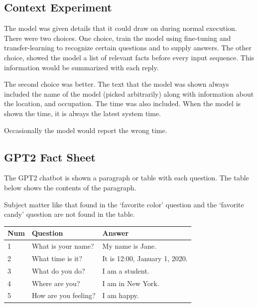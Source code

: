 \subsection{Context Experiment}
The model was given details that it could draw on during normal execution. 
There were two choices. One choice, train the model using fine-tuning and transfer-learning to recognize certain questions and to supply answers. The other choice, showed the model a list of relevant facts before every input sequence. This information would be summarized with each reply.

The second choice was better. The text that the model was shown always included the name of the model (picked arbitrarily) along with information about the location, and occupation. The time was also included. When the model is shown the time, it is always the latest system time.

Occasionally the model would report the wrong time. %

\subsection{GPT2 Fact Sheet}

The GPT2 chatbot is shown a paragraph or table with each question. The table below shows the contents of the paragraph. 


Subject matter like that found in the `favorite color' question and the `favorite candy' question are not found in the table.

\begin{table}[h]
	\begin{center}	
		
		\begin{tabular}{lll}
			Num & Question             & Answer                        \\
			\hline \hline
			1   & What is your name?   & My name is Jane.              \\
			2   & What time is it?     & It is 12:00, January 1, 2020. \\
			3   & What do you do?      & I am a student.               \\
			4   & Where are you?       & I am in New York.             \\
			5   & How are you feeling? & I am happy.                  \\
			\hline     
		\end{tabular}
	\end{center}
	\label{fig-fact-sheet}
	
\end{table}


